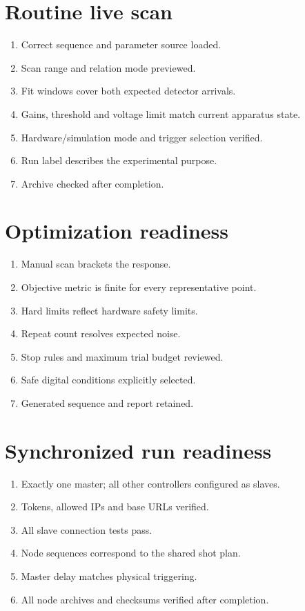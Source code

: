 \documentclass[11pt,oneside,openany]{book}
\begin{document}
\section{Routine live scan}
\begin{enumerate}[label=$\square$]
  \item Correct sequence and parameter source loaded.
  \item Scan range and relation mode previewed.
  \item Fit windows cover both expected detector arrivals.
  \item Gains, threshold and voltage limit match current apparatus state.
  \item Hardware/simulation mode and trigger selection verified.
  \item Run label describes the experimental purpose.
  \item Archive checked after completion.
\end{enumerate}

\section{Optimization readiness}
\begin{enumerate}[label=$\square$]
  \item Manual scan brackets the response.
  \item Objective metric is finite for every representative point.
  \item Hard limits reflect hardware safety limits.
  \item Repeat count resolves expected noise.
  \item Stop rules and maximum trial budget reviewed.
  \item Safe digital conditions explicitly selected.
  \item Generated sequence and report retained.
\end{enumerate}

\section{Synchronized run readiness}
\begin{enumerate}[label=$\square$]
  \item Exactly one master; all other controllers configured as slaves.
  \item Tokens, allowed IPs and base URLs verified.
  \item All slave connection tests pass.
  \item Node sequences correspond to the shared shot plan.
  \item Master delay matches physical triggering.
  \item All node archives and checksums verified after completion.
\end{enumerate}
\end{document}
